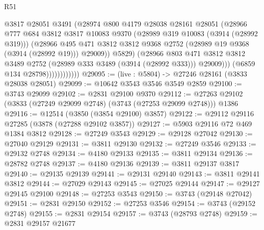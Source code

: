 \begin{lexlean}{R51}
\begin{coremodule}
                              @3817
                              @28051
                              @3491
                              (@28974
                                @800
                                @4179
                                @28038
                                @28161
                                @28051
                                (@28966
                                  @777
                                  @684
                                  @3812
                                  @3817
                                  @10083
                                  @9370
                                  (@28989 @319 @10083 (@3914 (@28992 @319)))
                                  (@28966
                                    @495
                                    @471
                                    @3812
                                    @3812
                                    @9368
                                    @2752
                                    (@28989 @19 @9368 (@3914 (@28992 @19)))
                                    @29009))
                                @5829)
                              (@28966
                                @803
                                @471
                                @3812
                                @3812
                                @3489
                                @2752
                                (@28989 @333 @3489 (@3914 (@28992 @333)))
                                @29009)))
                          (@6859 @134 @28798))))))))))))
@29095 := (live : @5804) -> @27246 @28161 (@3833 @28038 @28051)
@29099 := @10642 @3543 @3546 @3549 @2859
@29100 := @3743 @29099
@29102 := @2831 @29100 @9370
@29112 := @27263 @29102 (@3833 (@27249 @29099 @2748) (@3743 (@27253 @29099 @2748))) @1386
@29116 := @12514 (@3850 (@3854 @29100) @3857)
@29122 := @29112 @29116 @27285 (@3878 (@27288 @29102 @3857))
@29127 := @5903 @29116 @72 @469 @1384 @3812
@29128 := @27249 @3543
@29129 := @29128 @27042
@29130 := @27040 @29129
@29131 := @3811 @29130
@29132 := @27249 @3546
@29133 := @29132 @2748
@29134 := @4180 @29133
@29135 := @3811 @29134
@29136 := @28782 @2748
@29137 := @4180 @29136
@29139 := @3811 @29137 @3817
@29140 := @29135 @29139
@29141 := @29131 @29140
@29143 := @3811 @29141 @3812
@29144 := @27029 @29143
@29145 := @27025 @29144
@29147 := @29127 @29145 @29100
@29148 := @27253 @3543
@29150 := @3743 (@29148 @27042)
@29151 := @2831 @29150
@29152 := @27253 @3546
@29154 := @3743 (@29152 @2748)
@29155 := @2831 @29154
@29157 := @3743 (@28793 @2748)
@29159 := @2831 @29157 @21677

\end{coremodule}
\end{lexlean}
